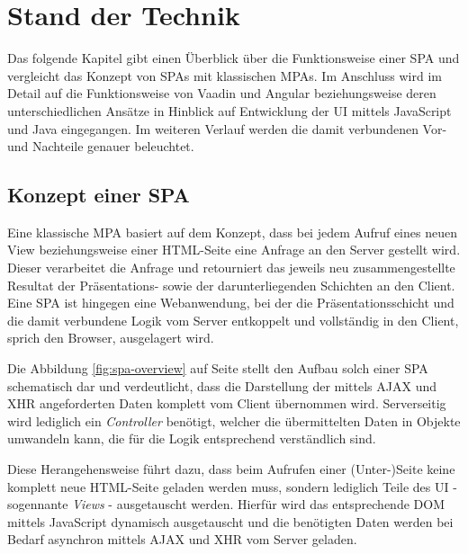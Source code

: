 \documentclass[a4paper,12pt,twoside]{scrreprt}
\begin{document}
\chapter{Stand der Technik}
\label{chap:stand-technik}
Das folgende Kapitel gibt einen Überblick über die Funktionsweise einer \acl{SPA} und vergleicht das Konzept von \acsp{SPA} mit klassischen \aclp{MPA}. Im Anschluss wird im Detail auf die Funktionsweise von Vaadin und Angular beziehungsweise deren unterschiedlichen Ansätze in Hinblick auf Entwicklung der \acs{UI} mittels JavaScript und Java eingegangen. Im weiteren Verlauf werden die damit verbundenen Vor- und Nachteile genauer beleuchtet.

\section{Konzept einer \acl{SPA}}
\label{sec:konzept-spa}
Eine klassische \acl{MPA} basiert auf dem Konzept, dass bei jedem Aufruf eines neuen View beziehungsweise einer HTML-Seite eine Anfrage an den Server gestellt wird. Dieser verarbeitet die Anfrage und retourniert das jeweils neu zusammengestellte Resultat der Präsentations- sowie der darunterliegenden Schichten an den Client. Eine \acl{SPA} ist hingegen eine Webanwendung, bei der die Präsentationsschicht und die damit verbundene Logik vom Server entkoppelt und vollständig in den Client, sprich den Browser, ausgelagert wird. \parencite[][Seite 5ff.]{scott_spa_2015}

Die Abbildung \ref{fig:spa-overview} auf Seite \pageref{fig:spa-overview} stellt den Aufbau solch einer \acs{SPA} schematisch dar und verdeutlicht, dass die Darstellung der mittels \acs{AJAX} und XHR angeforderten Daten komplett vom Client übernommen wird. Serverseitig wird lediglich ein \textit{Controller} benötigt, welcher die übermittelten Daten in Objekte umwandeln kann, die für die Logik entsprechend verständlich sind.

\medskip

Diese Herangehensweise führt dazu, dass beim Aufrufen einer (Unter-)Seite keine komplett neue HTML-Seite geladen werden muss, sondern lediglich Teile des \acl{UI} - sogennante \textit{Views} - ausgetauscht werden. Hierfür wird das entsprechende \ac{DOM} mittels JavaScript dynamisch ausgetauscht und die benötigten Daten werden bei Bedarf asynchron mittels \acs{AJAX} und XHR vom Server geladen. \parencite[][Seite 7]{scott_spa_2015}
\end{document}
